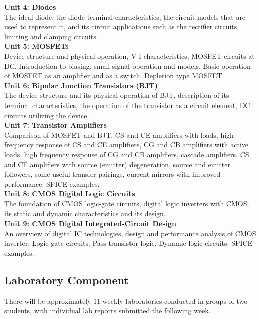 \documentclass[10pt]{article}
\begin{document}
\textbf{Unit 4: Diodes} \\
The ideal diode, the diode terminal characteristics, the circuit models that are used to represent it, and its circuit applications such as the rectifier circuits, limiting and clamping circuits. \\

\textbf{Unit 5: MOSFETs} \\
Device structure and physical operation, V-I characteristics, MOSFET circuits at DC.  Introduction to biasing, small signal operation and models.  Basic operation of MOSFET as an amplifier and as a switch. Depletion type MOSFET. \\

\textbf{Unit 6: Bipolar Junction Transistors (BJT)} \\
The device structure and its physical operation of BJT, description of its terminal characteristics, the operation of the transistor as a circuit element, DC circuits utilizing the device. \\

\textbf{Unit 7: Transistor Amplifiers} \\
Comparison of MOSFET and BJT, CS and CE amplifiers with loads, high frequency response of CS and CE amplifiers, CG and CB amplifiers with active loads, high frequency response of CG and CB amplifiers, cascade amplifiers.  CS and CE amplifiers with source (emitter) degeneration, source and emitter followers, some useful transfer pairings, current mirrors with improved performance.  SPICE examples. \\

\textbf{Unit 8: CMOS Digital Logic Circuits} \\
The foundation of CMOS logic-gate circuits, digital logic inverters with CMOS; its static and dynamic characteristics and its design. \\

\textbf{Unit 9: CMOS Digital Integrated-Circuit Design} \\
An overview of digital IC technologies, design and performance analysis of CMOS inverter.  Logic gate circuits.  Pass-transistor logic. Dynamic logic circuits.  SPICE examples. \\

\subsection*{Laboratory Component}

There will be approximately 11 weekly laboratories conducted in groups of two students, with individual lab reports submitted the following week.
\end{document}
